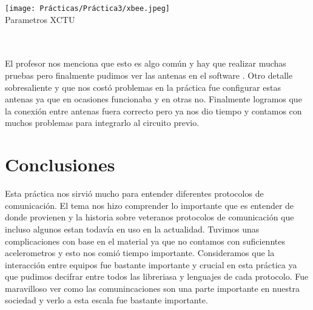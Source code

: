 \documentclass[conference]{IEEEtran}
\begin{document}
\begin{itemize}
    \begin{center}
    \texttt{[image: Prácticas/Práctica3/xbee.jpeg]}\\
    \caption{Parametros XCTU}
    \label{fig}
    \end{center}\\\\
    
    El profesor nos menciona que esto es algo común y hay que realizar muchas pruebas pero finalmente pudimos ver las antenas en el software . Otro detalle sobresaliente y que nos costó problemas en la práctica fue configurar estas antenas ya que en ocasiones funcionaba y en otras no. Finalmente logramos que la conexión entre antenas fuera correcto pero ya nos dio tiempo y contamos con muchos problemas para integrarlo al circuito previo. 

\end{itemize}


\section{Conclusiones}

\par Esta práctica nos sirvió mucho para entender diferentes protocolos de comunicación. El tema nos hizo comprender lo importante que es entender de donde provienen y la historia sobre veteranos protocolos de comunicación que incluso algunos estan todavía en uso en la actualidad. Tuvimos unas complicaciones con base en el material ya que no contamos con suficienntes acelerometros y esto nos comió tiempo importante. Consideramos que la interacción entre equipos fue bastante importante y crucial en esta práctica ya que pudimos decifrar entre todos las libreriasa y lenguajes de cada protocolo. Fue maravilloso ver como las comunincaciones son una parte importante en nuestra sociedad y verlo a esta escala fue bastante importante. 
\end{document}
